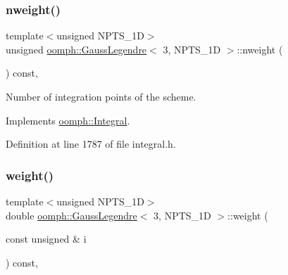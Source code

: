 \mbox{\label{classoomph_1_1GaussLegendre_3_013_00_01NPTS__1D_01_4_a526e077429bd9febc58073333e3257c7}} 
\subsubsection{\texorpdfstring{nweight()}{nweight()}}
{\footnotesize\ttfamily template$<$unsigned N\+P\+T\+S\+\_\+1D$>$ \\
unsigned \hyperlink{classoomph_1_1GaussLegendre}{oomph\+::\+Gauss\+Legendre}$<$ 3, N\+P\+T\+S\+\_\+1D $>$\+::nweight (\begin{DoxyParamCaption}{ }\end{DoxyParamCaption}) const\hspace{0.3cm}{\ttfamily [inline]}, {\ttfamily [virtual]}}



Number of integration points of the scheme. 



Implements \hyperlink{classoomph_1_1Integral_a1a270de9d99a1fcf1d25a6c1017f65fa}{oomph\+::\+Integral}.



Definition at line 1787 of file integral.\+h.

\mbox{\label{classoomph_1_1GaussLegendre_3_013_00_01NPTS__1D_01_4_ab35137bd69a4ae002392ce31c63cd8e6}} 
\subsubsection{\texorpdfstring{weight()}{weight()}}
{\footnotesize\ttfamily template$<$unsigned N\+P\+T\+S\+\_\+1D$>$ \\
double \hyperlink{classoomph_1_1GaussLegendre}{oomph\+::\+Gauss\+Legendre}$<$ 3, N\+P\+T\+S\+\_\+1D $>$\+::weight (\begin{DoxyParamCaption}\item[{const unsigned \&}]{i }\end{DoxyParamCaption}) const\hspace{0.3cm}{\ttfamily [inline]}, {\ttfamily [virtual]}}



